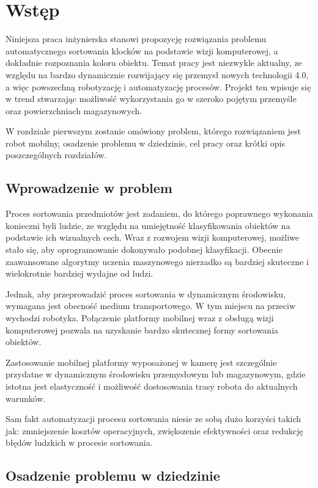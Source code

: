 \chapter{Wstęp}
\label{ch:wstep}

Niniejsza praca inżynierska stanowi propozycję rozwiązania problemu automatycznego sortowania klocków na podstawie wizji komputerowej, a dokładnie rozpoznania koloru obiektu. Temat pracy jest niezwykle aktualny, ze względu na bardzo dynamicznie rozwijający się przemysł nowych technologii 4.0, a więc  powszechną robotyzację i automatyzację procesów. Projekt ten wpisuje się w trend stwarzając możliwość wykorzystania go w szeroko pojętym przemyśle oraz powierzchniach magazynowych. 

W rozdziale pierwszym zostanie omówiony problem, którego rozwiązaniem jest robot mobilny, osadzenie problemu w dziedzinie, cel pracy oraz krótki opis poszczególnych rozdziałów. 

\section{Wprowadzenie w problem}
\label{sec:wprowadzenie}

Proces sortowania przedmiotów jest zadaniem, do którego poprawnego wykonania konieczni byli ludzie, ze względu na umiejętność klasyfikowania obiektów na podstawie ich wizualnych cech. Wraz z rozwojem wizji komputerowej, możliwe stało się, aby oprogramowanie dokonywało podobnej klasyfikacji. Obecnie zaawansowane algorytmy uczenia maszynowego nierzadko są bardziej skuteczne i wielokrotnie bardziej wydajne od ludzi. 

Jednak, aby przeprowadzić proces sortowania w dynamicznym środowisku, wymagana jest obecność medium transportowego. W tym miejscu na przeciw wychodzi robotyka. Połączenie platformy mobilnej wraz z obsługą wizji komputerowej pozwala na uzyskanie bardzo skutecznej formy sortowania obiektów. 

Zastosowanie mobilnej platformy wyposażonej w kamerę jest szczególnie przydatne w dynamicznym środowisku przemysłowym lub magazynowym, gdzie istotna jest elastyczność i możliwość dostosowania trasy robota do aktualnych warunków. 

Sam fakt automatyzacji procesu sortowania niesie ze sobą dużo korzyści takich jak: zmniejszenie kosztów operacyjnych, zwiększenie efektywności oraz redukcję błędów ludzkich w procesie sortowania.  

\section{Osadzenie problemu w dziedzinie}
\label{sec:osadzenie}

